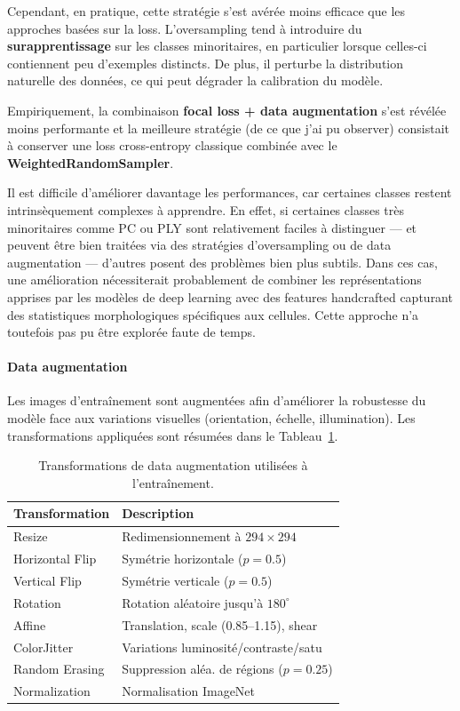 \documentclass[journal,twocolumn]{IEEEtran}
\begin{document}
Cependant, en pratique, cette stratégie s’est avérée moins efficace que les approches basées sur la loss. L’oversampling tend à introduire du \textbf{surapprentissage} sur les classes minoritaires, en particulier lorsque celles-ci contiennent peu d’exemples distincts. De plus, il perturbe la distribution naturelle des données, ce qui peut dégrader la calibration du modèle. 

Empiriquement, la combinaison \textbf{focal loss + data augmentation} s’est révélée moins performante et la meilleure stratégie (de ce que j'ai pu observer) consistait à conserver une loss cross-entropy classique combinée avec le \textbf{WeightedRandomSampler}. 


Il est difficile d’améliorer davantage les performances, car certaines classes restent intrinsèquement complexes à apprendre. En effet, si certaines classes très minoritaires comme PC ou PLY sont relativement faciles à distinguer — et peuvent être bien traitées via des stratégies d’oversampling ou de data augmentation — d’autres posent des problèmes bien plus subtils. Dans ces cas, une amélioration nécessiterait probablement de combiner les représentations apprises par les modèles de deep learning avec des features handcrafted capturant des statistiques morphologiques spécifiques aux cellules. Cette approche n’a toutefois pas pu être explorée faute de temps.



\paragraph{Data augmentation}

Les images d'entraînement sont augmentées afin d'améliorer la robustesse du modèle face aux variations visuelles (orientation, échelle, illumination). Les transformations appliquées sont résumées dans le Tableau~\ref{tab:data_aug}.

\begin{table}[h]
\centering
\caption{Transformations de data augmentation utilisées à l'entraînement.}
\label{tab:data_aug}
\begin{tabular}{|l|l|}
\hline
\textbf{Transformation} & \textbf{Description} \\
\hline
Resize & Redimensionnement à $294 \times 294$ \\
Horizontal Flip & Symétrie horizontale ($p=0.5$) \\
Vertical Flip & Symétrie verticale ($p=0.5$) \\
Rotation & Rotation aléatoire jusqu'à $180^\circ$ \\
Affine & Translation, scale (0.85–1.15), shear \\
ColorJitter & Variations luminosité/contraste/satu\\
Random Erasing & Suppression aléa. de régions ($p=0.25$) \\
Normalization & Normalisation ImageNet \\
\hline
\end{tabular}
\end{table}
\end{document}
